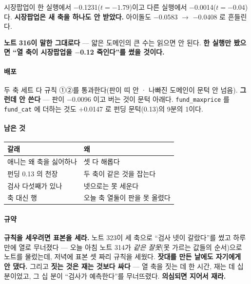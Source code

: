 \documentclass[10pt]{article}
\begin{document}
시장팝업이 한 실행에서 $-$0.1231($t{=}{-}1.79$)이고 다른 실행에서
$-$0.0014($t{=}{-}0.04$)다. \textbf{시장팝업은 새 축을 하나도 안 받았다.}
아이돌도 $-$0.0583 $\to$ $-$0.0408 로 흔들린다.

\textbf{노트 316이 말한 그대로다} --- 얇은 도메인의 큰 수는 읽으면 안 된다.
\textbf{한 실행만 봤으면 ``열 축이 시장팝업을 $-$0.12 죽인다''를 썼을
것이다.}

\paragraph{배포} 두 축 세트 다 규칙 ①②를 통과한다(판이 띠 안 · 나빠진
도메인이 문턱 안 넘음). \textbf{그런데 안 쓴다} --- 판이 $-$0.0096 이고
버는 것이 문턱 아래다. \texttt{fund\_maxprice} 를 \texttt{fund\_cat} 에
더하는 것도 $+$0.0147 로 펀딩 문턱(0.13)의 9분의 1이다.

\paragraph{남은 것}
\begin{center}\small
\begin{tabular}{ll}
\hline
갈래 & 왜 \\
\hline
애니는 왜 축을 싫어하나 & 셋 다 해롭다 \\
펀딩 0.13 의 천장 & 두 축이 같은 것을 잡는다 \\
검사 다섯째가 있나 & 넷으로는 못 세운다 \\
축 대신 행 & 오늘 축 열둘이 판을 못 올렸다 \\
\hline
\end{tabular}
\end{center}

\paragraph{규약} \textbf{규칙을 세우려면 표본을 세라.} 노트 323이 세 축으로
``검사 넷이 갈랐다''를 썼고 하루 만에 열로 무너졌다 --- 오늘 아침 노트 314가
\emph{같은 잘못}(못 가르는 값들의 순서)으로 노트를 물렀는데, 저녁에 표본 셋
짜리 규칙을 세웠다. \textbf{잣대를 만든 날에도 자기에게 안 댔다.}
그리고 \textbf{짓는 것은 재는 것보다 싸다} --- 열 축을 짓는 데 한 시간,
재는 데 십 분이었고, 그 십 분이 ``검사가 예측한다''를 무너뜨렸다.
\textbf{의심되면 지어서 재라.}
\end{document}
